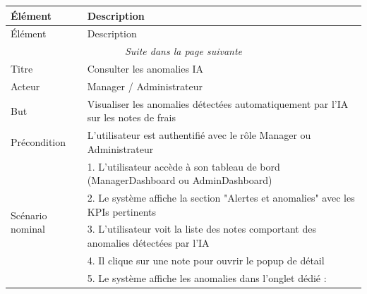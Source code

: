 \documentclass[12pt,a4paper]{report}
\begin{document}
\begin{longtable}{|p{3cm}|p{11cm}|}

\hline

Élément & Description \\

\hline

\endfirsthead

\hline

Élément & Description \\

\hline

\endhead

\hline

\multicolumn{2}{|c|}{\textit{Suite dans la page suivante}} \\

\hline

\endfoot

\hline

\endlastfoot

Titre & Consulter les anomalies IA \\

\hline

Acteur & Manager / Administrateur \\

\hline

But & Visualiser les anomalies détectées automatiquement par l'IA sur les notes de frais\\

\hline

Précondition & L'utilisateur est authentifié avec le rôle Manager ou Administrateur \\

\hline

\multirow{8}{*}{Scénario nominal} & 1. L'utilisateur accède à son tableau de bord (ManagerDashboard ou AdminDashboard) \\

& 2. Le système affiche la section "Alertes et anomalies" avec les KPIs pertinents \\

& 3. L'utilisateur voit la liste des notes comportant des anomalies détectées par l'IA \\

& 4. Il clique sur une note pour ouvrir le popup de détail \\

& 5. Le système affiche les anomalies dans l'onglet dédié : \\


\end{longtable}
\end{document}
